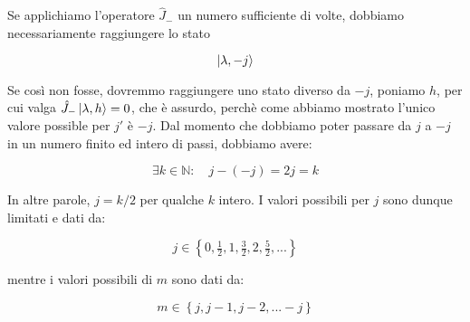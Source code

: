 Se applichiamo l'operatore $\hat{J}_-$ un numero sufficiente di volte, dobbiamo necessariamente raggiungere lo stato

	\[
		\ket{\lambda, -j}
	\]

Se cos\`i non fosse, dovremmo raggiungere uno stato diverso da $-j$, poniamo $h$, per cui valga $\hat{J}_- \ket{\lambda, h} = 0$, che \`e assurdo, perch\`e come abbiamo mostrato l'unico valore possible per $j'$ \`e $-j$. Dal momento che dobbiamo poter passare da $j$ a $-j$ in un numero finito ed intero di passi, dobbiamo avere:

	\begin{equation}
		\exists k \in \mathbb{N} : \quad j - (- j) = 2j = k
	\end{equation}

In altre parole, $j = k/2$ per qualche $k$ intero. I valori possibili per $j$ sono dunque limitati e dati da:

	\begin{equation}
		j \in \left \{ 0, \tfrac{1}{2}, 1, \tfrac{3}{2}, 2, \tfrac{5}{2}, ... \right \}
	\end{equation}

mentre i valori possibili di $m$ sono dati da:

	\begin{equation}
		m \in \left \{ j, j-1, j-2, ... -j \right \}
	\end{equation}
